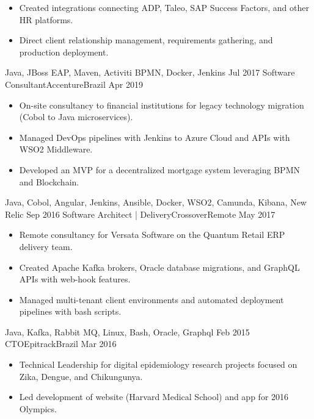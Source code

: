\begin{experiences}
{\begin{itemize}
                        \item Created integrations connecting ADP, Taleo, SAP Success Factors, and other HR platforms.
                        \item Direct client relationship management, requirements gathering, and production deployment.          
                      \end{itemize}
                    }
                    {Java, JBoss EAP, Maven, Activiti BPMN, Docker, Jenkins}
  \emptySeparator
  \experience
    {Jul 2017}     {Software Consultant}{Accenture}{Brazil}
    {Apr 2019}    {
                      \begin{itemize}
                        \item On-site consultancy to financial institutions for legacy technology migration (Cobol to Java microservices).
                        \item Managed DevOps pipelines with Jenkins to Azure Cloud and APIs with WSO2 Middleware.
                        \item Developed an MVP for a decentralized mortgage system leveraging BPMN and Blockchain.
                      \end{itemize}
                    }
                    {Java, Cobol, Angular, Jenkins, Ansible, Docker, WSO2, Camunda, Kibana, New Relic}
  \emptySeparator
  \experience
    {Sep 2016}     {Software Architect | Delivery}{Crossover}{Remote}
    {May 2017}    {
                      \begin{itemize}
                        \item Remote consultancy for Versata Software on the Quantum Retail ERP delivery team.
                        \item Created Apache Kafka brokers, Oracle database migrations, and GraphQL APIs with web-hook features.
                        \item Managed multi-tenant client environments and automated deployment pipelines with bash scripts.
                      \end{itemize}
                    }
                    {Java, Kafka, Rabbit MQ, Linux, Bash, Oracle, Graphql}
  \emptySeparator
  \experience
    {Feb 2015}     {CTO}{Epitrack}{Brazil}
    {Mar 2016}    {
                      \begin{itemize}
                        \item Technical Leadership for digital epidemiology research projects focused on Zika, Dengue, and Chikungunya.
                        \item Led development of  website (Harvard Medical School) and  app for 2016 Olympics.

\end{itemize}}
\end{experiences}
